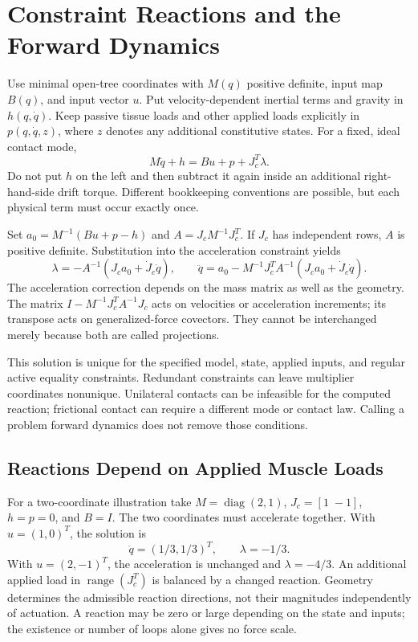 \section{Constraint Reactions and the Forward Dynamics}
\label{sec:drift_control_parallel}

Use minimal open-tree coordinates with $M(q)$ positive definite, input map
$B(q)$, and input vector $u$. Put velocity-dependent inertial terms and gravity
in $h(q,\dot q)$. Keep passive tissue loads and other applied loads explicitly
in $p(q,\dot q,z)$, where $z$ denotes any additional constitutive states. For a
fixed, ideal contact mode,
\begin{equation}
 M\ddot q+h=Bu+p+J_c^T\lambda.
 \label{eq:drift_control_constrained}
\end{equation}
Do not put $h$ on the left and then subtract it again inside an additional
right-hand-side drift torque. Different bookkeeping conventions are possible,
but each physical term must occur exactly once.

Set $a_0=M^{-1}(Bu+p-h)$ and $A=J_cM^{-1}J_c^T$. If $J_c$ has independent rows,
$A$ is positive definite. Substitution into the acceleration constraint yields
\begin{equation}
 \lambda=-A^{-1}(J_c a_0+\dot J_c\dot q),\qquad
 \ddot q=a_0-M^{-1}J_c^TA^{-1}(J_c a_0+\dot J_c\dot q).
 \label{eq:reaction_elimination}
\end{equation}
The acceleration correction depends on the mass matrix as well as the geometry.
The matrix $I-M^{-1}J_c^TA^{-1}J_c$ acts on velocities or acceleration
increments; its transpose acts on generalized-force covectors. They cannot be
interchanged merely because both are called projections.

This solution is unique for the specified model, state, applied inputs, and
regular active equality constraints. Redundant constraints can leave multiplier
coordinates nonunique. Unilateral contacts can be infeasible for the computed
reaction; frictional contact can require a different mode or contact law.
Calling a problem forward dynamics does not remove those conditions.

\subsection{Reactions Depend on Applied Muscle Loads}

For a two-coordinate illustration take $M=\operatorname{diag}(2,1)$,
$J_c=[1\;-1]$, $h=p=0$, and $B=I$. The two coordinates must accelerate together.
With $u=(1,0)^T$, the solution is
\begin{equation}
 \ddot q=(1/3,1/3)^T,\qquad \lambda=-1/3.
 \label{eq:reaction_example}
\end{equation}
With $u=(2,-1)^T$, the acceleration is unchanged and $\lambda=-4/3$. An
additional applied load in $\operatorname{range}(J_c^T)$ is balanced by a changed
reaction. Geometry determines the admissible reaction directions, not their
magnitudes independently of actuation. A reaction may be zero or large depending
on the state and inputs; the existence or number of loops alone gives no force
scale.

